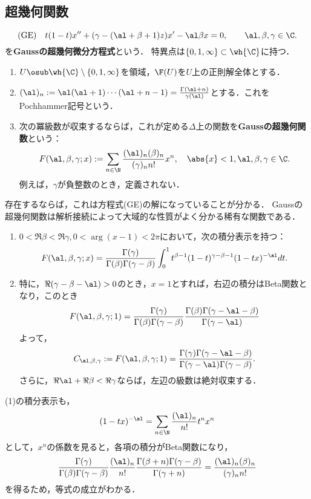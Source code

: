 \documentclass[uplatex,dvipdfmx]{jsreport}
\begin{document}
\subsection{超幾何関数}

\begin{problem}
    \[\text{(GE)}\quad t(1-t)x''+(\gamma-(\al+\beta+1)z)x'-\al\beta x=0,\qquad\al,\beta,\gamma\in\C.\]
    を\textbf{Gaussの超幾何微分方程式}という．
    特異点は$\{0,1,\infty\}\subset\wh{\C}$に持つ．
    \begin{enumerate}
        \item $U\osub\wh{\C}\setminus\{0,1,\infty\}$を領域，$\F(U)$を$U$上の正則解全体とする．
        \item $(\al)_n:=\al(\al+1)\cdots(\al+n-1)=\frac{\Gamma(\al+n)}{\gamma(\al)}$とする．これをPochhammer記号という．
        \item 次の冪級数が収束するならば，これが定める$\Delta$上の関数を\textbf{Gaussの超幾何関数}という：
        \[F(\al,\beta,\gamma;x):=\sum_{n\in\N}\frac{(\al)_n(\beta)_n}{(\gamma)_nn!}x^n,\quad\abs{x}<1,\al,\beta,\gamma\in\C.\]
        例えば，$\gamma$が負整数のとき，定義されない．
    \end{enumerate}
    存在するならば，これは方程式(GE)の解になっていることが分かる．
    Gaussの超幾何関数は解析接続によって大域的な性質がよく分かる稀有な関数である．
\end{problem}

\begin{proposition}[Gaussの積分表示]\mbox{}
    \begin{enumerate}
        \item $0<\Re\beta<\Re\gamma,0<\arg(x-1)<2\pi$において，次の積分表示を持つ：
        \[F(\al,\beta,\gamma;x)=\frac{\Gamma(\gamma)}{\Gamma(\beta)\Gamma(\gamma-\beta)}\int^1_0t^{\beta-1}(1-t)^{\gamma-\beta-1}(1-tx)^{-\al}dt.\]
        \item 特に，$\Re(\gamma-\beta-\al)>0$のとき，$x=1$とすれば，右辺の積分はBeta関数となり，このとき
        \[F(\al,\beta,\gamma;1)=\frac{\Gamma(\gamma)}{\Gamma(\beta)\Gamma(\gamma-\beta)}\frac{\Gamma(\beta)\Gamma(\gamma-\al-\beta)}{\Gamma(\gamma-\al)}\]
        よって，
        \[C_{\al,\beta,\gamma}:=F(\al,\beta,\gamma;1)=\frac{\Gamma(\gamma)\Gamma(\gamma-\al-\beta)}{\Gamma(\gamma-\al)\Gamma(\gamma-\beta)}.\]
        さらに，$\Re\al+\Re\beta<\Re\gamma$ならば，左辺の級数は絶対収束する．
    \end{enumerate}
\end{proposition}
\begin{remark}
    (1)の積分表示も，
    \[(1-tx)^{-\al}=\sum_{n\in\N}\frac{(\al)_n}{n!}t^nx^n\]
    として，$x^n$の係数を見ると，各項の積分がBeta関数になり，
    \[\frac{\Gamma(\gamma)}{\Gamma(\beta)\Gamma(\gamma-\beta)}\frac{(\al)_n}{n!}\frac{\Gamma(\beta+n)\Gamma(\gamma-\beta)}{\Gamma(\gamma+n)}=\frac{(\al)_n(\beta)_n}{(\gamma)_nn!}\]
    を得るため，等式の成立がわかる．
\end{remark}
\end{document}

